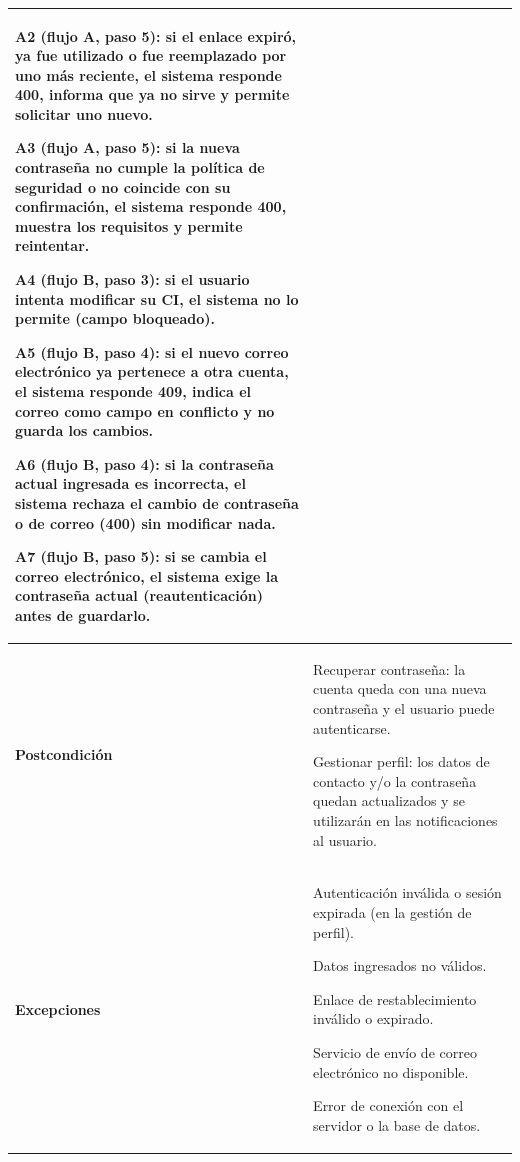 \begin{longtable}{>{\raggedright\arraybackslash}p{2.9cm} >{\raggedright\arraybackslash}p{12.6cm}}
\begin{cuvin}
    \item A2 (flujo A, paso 5): si el enlace expiró, ya fue utilizado o fue reemplazado por uno más reciente, el sistema responde 400, informa que ya no sirve y permite solicitar uno nuevo.
    \item A3 (flujo A, paso 5): si la nueva contraseña no cumple la política de seguridad o no coincide con su confirmación, el sistema responde 400, muestra los requisitos y permite reintentar.
    \item A4 (flujo B, paso 3): si el usuario intenta modificar su CI, el sistema no lo permite (campo bloqueado).
    \item A5 (flujo B, paso 4): si el nuevo correo electrónico ya pertenece a otra cuenta, el sistema responde 409, indica el correo como campo en conflicto y no guarda los cambios.
    \item A6 (flujo B, paso 4): si la contraseña actual ingresada es incorrecta, el sistema rechaza el cambio de contraseña o de correo (400) sin modificar nada.
    \item A7 (flujo B, paso 5): si se cambia el correo electrónico, el sistema exige la contraseña actual (reautenticación) antes de guardarlo.
\end{cuvin} \\
\midrule
\textbf{Postcondición} & \vspace{-\baselineskip}\begin{cuvin}
    \item Recuperar contraseña: la cuenta queda con una nueva contraseña y el usuario puede autenticarse.
    \item Gestionar perfil: los datos de contacto y/o la contraseña quedan actualizados y se utilizarán en las notificaciones al usuario.
\end{cuvin} \\
\midrule
\textbf{Excepciones} & \vspace{-\baselineskip}\begin{cuvin}
    \item Autenticación inválida o sesión expirada (en la gestión de perfil).
    \item Datos ingresados no válidos.
    \item Enlace de restablecimiento inválido o expirado.
    \item Servicio de envío de correo electrónico no disponible.
    \item Error de conexión con el servidor o la base de datos.
\end{cuvin} \\
\end{longtable}
\endgroup
\addtocounter{table}{-1}

